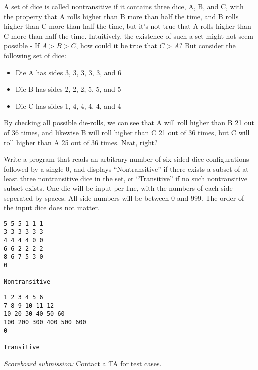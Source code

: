 \documentclass[11pt]{cselabheader}
\theoremstyle{plain}
\begin{document}
\begin{enumerate}
    A set of dice is called nontransitive if it contains three dice,
    A, B, and C, with the property that A rolls higher than B more
    than half the time, and B rolls higher than C more than half
    the time, but it's not true that A rolls higher than C more than
    half the time. Intuitively, the existence of such a set might not
    seem possible - If $A > B > C$, how could it be true that $C > A$?
    But consider the following set of dice:

    \begin{itemize}
      \item Die A has sides 3, 3, 3, 3, 3, and 6
      \item Die B has sides 2, 2, 2, 5, 5, and 5
      \item Die C has sides 1, 4, 4, 4, 4, and 4
    \end{itemize}
    By checking all possible die-rolls, we can see that A will roll
    higher than B 21 out of 36 times, and likewise B will roll higher
    than C 21 out of 36 times, but C will roll higher than A 25 out
    of 36 times. Neat, right?

    Write a program that reads an arbitrary number of six-sided dice
    configurations followed by a single 0, and displays
    ``Nontransitive'' if there exists a subset of at least three
    nontransitive dice in the set, or ``Transitive'' if no such
    nontransitive subset exists. One die will be input per line,
    with the numbers of each side seperated by spaces. All side
    numbers will be between 0 and 999. The order of the input dice
    does not matter.

    \begin{minipage}{.5\linewidth}
      \begin{minipage}{.9\linewidth}
        \begin{lstlisting}[style=bash]
5 5 5 1 1 1
3 3 3 3 3 3
4 4 4 4 0 0
6 6 2 2 2 2
8 6 7 5 3 0
0

Nontransitive
        \end{lstlisting}
      \end{minipage}
    \end{minipage}
    \begin{minipage}{.5\linewidth}
      \begin{minipage}{.9\linewidth}
        \begin{lstlisting}[style=bash]
1 2 3 4 5 6
7 8 9 10 11 12
10 20 30 40 50 60
100 200 300 400 500 600
0

Transitive
        \end{lstlisting}
      \end{minipage}
    \end{minipage}

    \textit{Scoreboard submission:} Contact a TA for test cases.
\end{enumerate}
\pagebreak
\end{document}
